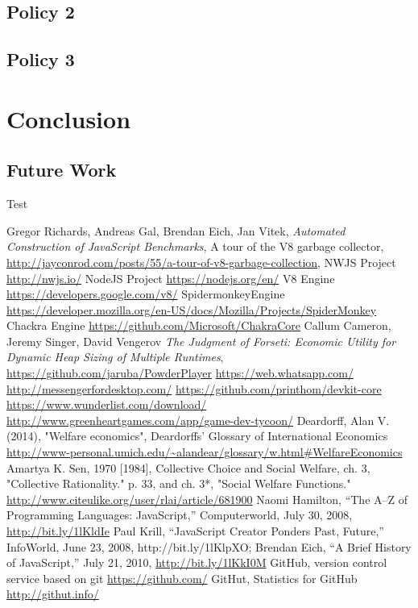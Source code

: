 \documentclass{l4proj}
\begin{document}
\section{Policy 2}
\section{Policy 3}
\chapter{Conclusion}
\section{Future Work}
Test
\begin{thebibliography}{9}
Gregor Richards, Andreas Gal, Brendan Eich, Jan Vitek,
\emph{Automated Construction of JavaScript Benchmarks},
A tour of the V8 garbage collector,
\url{http://jayconrod.com/posts/55/a-tour-of-v8-garbage-collection},
NWJS Project
\url{http://nwjs.io/}
NodeJS Project
\url{https://nodejs.org/en/}
V8 Engine
\url{https://developers.google.com/v8/}
SpidermonkeyEngine
\url{https://developer.mozilla.org/en-US/docs/Mozilla/Projects/SpiderMonkey}
Chackra Engine
\url{https://github.com/Microsoft/ChakraCore}
Callum Cameron, Jeremy Singer, David Vengerov
\emph{The Judgment of Forseti: Economic Utility for Dynamic Heap Sizing of Multiple Runtimes},
\url{https://github.com/jaruba/PowderPlayer}
\url{https://web.whatsapp.com/}
\url{http://messengerfordesktop.com/}
\url{https://github.com/printhom/devkit-core}
\url{https://www.wunderlist.com/download/}
\url{http://www.greenheartgames.com/app/game-dev-tycoon/}
Deardorff, Alan V. (2014), "Welfare economics", Deardorffs' Glossary of International Economics \url{http://www-personal.umich.edu/~alandear/glossary/w.html#WelfareEconomics}
Amartya K. Sen, 1970 [1984], Collective Choice and Social Welfare, ch. 3, "Collective Rationality." p. 33, and ch. 3*, "Social Welfare Functions." \hspace*{1em} \url{http://www.citeulike.org/user/rlai/article/681900}
Naomi Hamilton, “The A–Z of Programming Languages: JavaScript,” Computerworld, July 30, 2008, \url{http://bit.ly/1lKldIe}
 Paul Krill, “JavaScript Creator Ponders Past, Future,” InfoWorld, June 23, 2008, http://bit.ly/1lKlpXO; Brendan Eich, “A Brief History of JavaScript,” July 21, 2010, \url{http://bit.ly/1lKkI0M}
GitHub, version control service based on git \hspace*{1em} \url{https://github.com/}
GitHut, Statistics for GitHub \hspace*{1em} \url{http://githut.info/}
\end{thebibliography}
\end{document}
